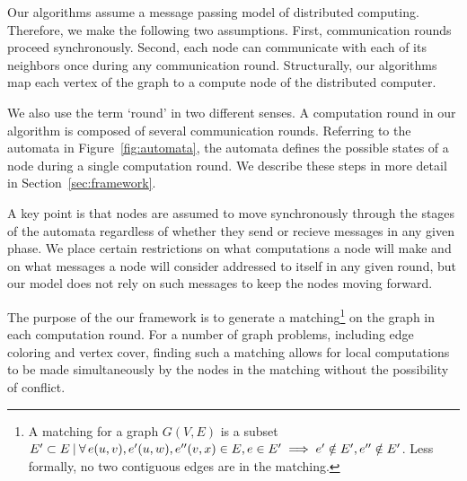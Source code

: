 Our algorithms assume a message passing model of distributed computing. Therefore, we make the following two assumptions. First, communication rounds proceed synchronously. Second, each node can communicate with each of its neighbors once during any communication round. Structurally, our algorithms map each vertex of the graph to a compute node of the distributed computer. 

We also use the term `round' in two different senses. A computation round in our algorithm is composed of several communication rounds. Referring to the automata in Figure~\ref{fig:automata}, the automata defines the possible states of a node during a single computation round. We describe these steps in more detail in Section~\ref{sec:framework}.

A key point is that nodes are assumed to move synchronously through the stages of the automata regardless of whether they send or recieve messages in any given phase. We place certain restrictions on what computations a node will make and on what messages a node will consider addressed to itself in any given round, but our model does not rely on such messages to keep the nodes moving forward.

The purpose of the our framework is to generate a matching\footnote{A matching for a graph $G(V,E)$ is a subset $E' \subset E {\: |\:} \forall\, e(u,v), e'(u,w), e''(v,x) \in E, e \in E' \implies e' \notin E', e'' \notin E'$. Less formally, no two contiguous edges are in the matching.} on the graph in each computation round. For a number of graph problems, including edge coloring and vertex cover, finding such a matching allows for local computations to be made simultaneously by the nodes in the matching without the possibility of conflict.  
